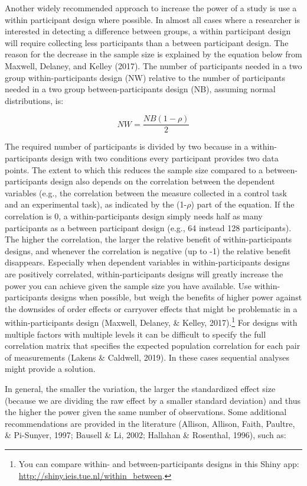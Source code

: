 \documentclass[
  english,
  ,jou, a4paper,floatsintext]{apa6}
\begin{document}
Another widely recommended approach to increase the power of a study is use a within participant design where possible. In almost all cases where a researcher is interested in detecting a difference between groups, a within participant design will require collecting less participants than a between participant design. The reason for the decrease in the sample size is explained by the equation below from Maxwell, Delaney, and Kelley (2017). The number of participants needed in a two group within-participants design (NW) relative to the number of participants needed in a two group between-participants design (NB), assuming normal distributions, is:

\[NW = \frac{NB (1-\rho)}{2}\]

The required number of participants is divided by two because in a within-participants design with two conditions every participant provides two data points. The extent to which this reduces the sample size compared to a between-participants design also depends on the correlation between the dependent variables (e.g., the correlation between the measure collected in a control task and an experimental task), as indicated by the (1-\(\rho\)) part of the equation. If the correlation is 0, a within-participants design simply needs half as many participants as a between participant design (e.g., 64 instead 128 participants). The higher the correlation, the larger the relative benefit of within-participants designs, and whenever the correlation is negative (up to -1) the relative benefit disappears. Especially when dependent variables in within-participants designs are positively correlated, within-participants designs will greatly increase the power you can achieve given the sample size you have available. Use within-participants designs when possible, but weigh the benefits of higher power against the downsides of order effects or carryover effects that might be problematic in a within-participants design (Maxwell, Delaney, \& Kelley, 2017).\footnote{You can compare within- and between-participants designs in this Shiny app: \url{http://shiny.ieis.tue.nl/within_between}.} For designs with multiple factors with multiple levels it can be difficult to specify the full correlation matrix that specifies the expected population correlation for each pair of measurements (Lakens \& Caldwell, 2019). In these cases sequential analyses might provide a solution.

In general, the smaller the variation, the larger the standardized effect size (because we are dividing the raw effect by a smaller standard deviation) and thus the higher the power given the same number of observations. Some additional recommendations are provided in the literature (Allison, Allison, Faith, Paultre, \& Pi-Sunyer, 1997; Bausell \& Li, 2002; Hallahan \& Rosenthal, 1996), such as:
\end{document}
